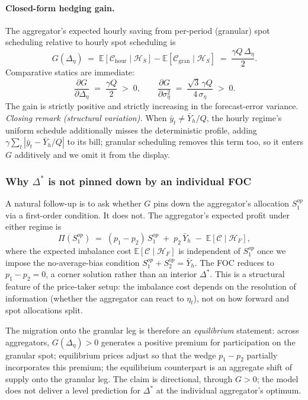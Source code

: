 \documentclass[11pt,a4paper]{article}
\theoremstyle{definition}
\theoremstyle{remark}
\theoremstyle{plain}
\begin{document}
\paragraph{Closed-form hedging gain.} The aggregator's expected hourly saving from per-period (granular) spot scheduling relative to hourly spot scheduling is
\begin{equation}
\boxed{\;G(\Delta_\eta) \;=\; \mathbb{E}[\mathcal{C}_{\text{hour}} \mid \mathcal{H}_S] - \mathbb{E}[\mathcal{C}_{\text{gran}} \mid \mathcal{H}_S] \;=\; \dfrac{\gamma Q \, \Delta_\eta}{2}.\;}
\label{eq:agg-gain}
\end{equation}
Comparative statics are immediate:
\begin{equation}
\dfrac{\partial G}{\partial \Delta_\eta} \;=\; \dfrac{\gamma Q}{2} \;>\; 0, \qquad \dfrac{\partial G}{\partial \sigma_\eta^2} \;=\; \dfrac{\sqrt{3}\,\gamma Q}{4\,\sigma_\eta} \;>\; 0.
\label{eq:agg-cs}
\end{equation}
The gain is strictly positive and strictly increasing in the forecast-error variance. \emph{Closing remark (structural variation).} When $\bar y_t \neq \bar Y_h/Q$, the hourly regime's uniform schedule additionally misses the deterministic profile, adding $\gamma \sum_t |\bar y_t - \bar Y_h/Q|$ to its bill; granular scheduling removes this term too, so it enters $G$ additively and we omit it from the display.

\subsubsection{Why $\Delta^*$ is not pinned down by an individual FOC}\label{app:aggregator:shift}
A natural follow-up is to ask whether $G$ pins down the aggregator's allocation $S_1^{op}$ via a first-order condition. It does not. The aggregator's expected profit under either regime is
\[
\Pi(S_1^{op}) \;=\; (p_1 - p_2)\, S_1^{op} \;+\; p_2 \, \bar Y_h \;-\; \mathbb{E}[\mathcal{C} \mid \mathcal{H}_F],
\]
where the expected imbalance cost $\mathbb{E}[\mathcal{C} \mid \mathcal{H}_F]$ is independent of $S_1^{op}$ once we impose the no-average-bias condition $S_1^{op} + S_2^{op} = \bar Y_h$. The FOC reduces to $p_1 - p_2 = 0$, a corner solution rather than an interior $\Delta^*$. This is a structural feature of the price-taker setup: the imbalance cost depends on the resolution of information (whether the aggregator can react to $\eta_t$), not on how forward and spot allocations split.

The migration onto the granular leg is therefore an \emph{equilibrium} statement: across aggregators, $G(\Delta_\eta) > 0$ generates a positive premium for participation on the granular spot; equilibrium prices adjust so that the wedge $p_1 - p_2$ partially incorporates this premium; the equilibrium counterpart is an aggregate shift of supply onto the granular leg. The claim is directional, through $G > 0$; the model does not deliver a level prediction for $\Delta^*$ at the individual aggregator's optimum.
\end{document}
